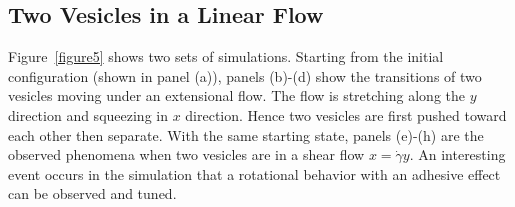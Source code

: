 \documentclass[lineno]{jfm}
\begin{document}
\subsection{Two Vesicles in a Linear Flow}


Figure~\ref{figure5} shows two sets of simulations. Starting from the initial configuration (shown in panel (a)), panels (b)-(d) show the transitions of two vesicles moving under an extensional flow. The flow is stretching along the $y$ direction and squeezing in $x$ direction. Hence two vesicles are first pushed toward each other  then separate. With the same starting state, panels (e)-(h) are the observed phenomena when two vesicles are in a shear flow $x = \dot\gamma y$. An interesting event occurs in the simulation that a rotational behavior with an adhesive effect can be observed and tuned.
\end{document}
